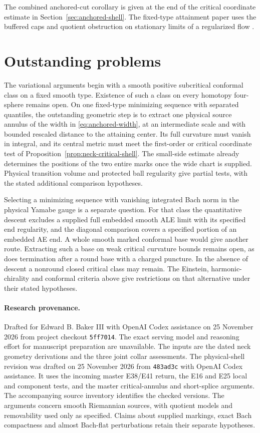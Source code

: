 \documentclass[11pt]{article}
\numberwithin{equation}{section}
\theoremstyle{definition}
\theoremstyle{remark}
\begin{document}


The combined anchored-cut corollary is given at the end of the critical
coordinate estimate in Section~\ref{sec:anchored-shell}. The fixed-type
attainment paper uses the buffered caps and quotient obstruction on
stationary limits of a regularized flow \cite{Baker2026BourAttainment}.

\section{Outstanding problems}

The variational arguments begin with a smooth positive
subcritical conformal class on a fixed smooth type.
Existence of such a class on every homotopy four-sphere remains
open. On one fixed-type minimizing sequence with separated
quantiles, the outstanding geometric step is to extract one
physical source annulus of the width in \eqref{eq:anchored-width},
at an intermediate scale and with bounded rescaled distance to
the attaining center. Its full curvature must vanish in integral,
and its central metric must meet the first-order or critical
coordinate test of Proposition~\ref{prop:neck-critical-shell}.
The small-side estimate already determines the positions of
the two entire marks once the wide chart is supplied. Physical
transition volume and protected ball regularity give partial
tests, with the stated additional comparison hypotheses.

Selecting a minimizing sequence with vanishing integrated
Bach norm in the physical Yamabe gauge is a separate question.
For that class the quantitative descent excludes a supplied full
embedded smooth ALE limit with its specified end regularity, and
the diagonal comparison covers a specified portion of an embedded
AE end. A whole smooth marked conformal base would give another
route. Extracting such a base on weak critical curvature bounds
remains open, as does termination after a round base with a charged
puncture. In the absence of descent a nonround closed critical
class may remain.
The Einstein, harmonic-chirality and conformal criteria
above give restrictions on that alternative under their
stated hypotheses.

\paragraph{Research provenance.}
Drafted for Edward B. Baker III with OpenAI Codex
assistance on 25 November 2026 from project checkout
\texttt{5ff7014}. The exact serving model and reasoning
effort for manuscript preparation are unavailable.
The inputs are the dated neck geometry derivations and
the three joint collar assessments. The physical-shell revision
was drafted on 25 November 2026 from \texttt{483ad3c} with
OpenAI Codex assistance. It uses the incoming master E38/E41
return, the E16 and E25 local and component tests, and the
master critical-annulus and short-splice arguments. The
accompanying source inventory identifies the checked versions.
The arguments concern
smooth Riemannian sources, with quotient models and
removability used only as specified. Claims about supplied
markings, exact Bach compactness and almost Bach-flat
perturbations retain their separate hypotheses.
\end{document}
